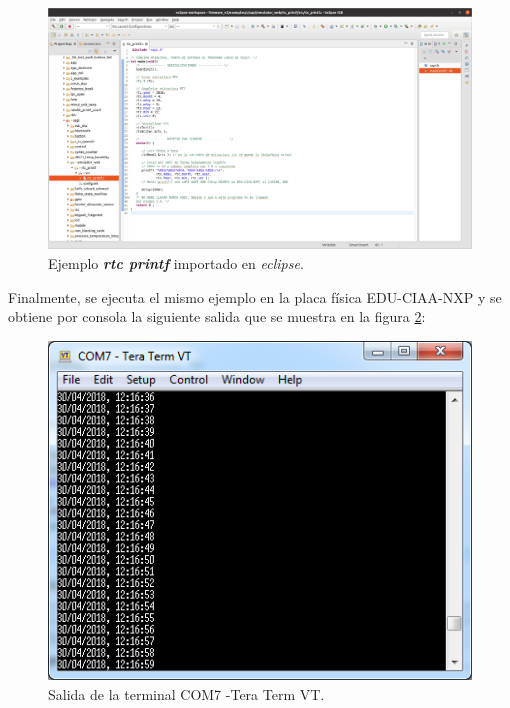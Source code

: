 \begin{figure}[ht]
	\centering
	\includegraphics[scale=.20]{./Figures/rtcprintfEclipse.png}
	\caption{Ejemplo \textit{\textbf{rtc printf}} importado en \textit{eclipse}.}
	\label{fig:rtcprintfEclipse}
\end{figure}

\hfill \break
\hfill \break
\hfill \break
\hfill \break
\hfill \break
\hfill \break
\hfill \break
\hfill \break


Finalmente, se ejecuta el mismo ejemplo en la placa física EDU-CIAA-NXP y se obtiene por consola la siguiente salida que se muestra en la figura \ref{fig:rtcprintfPlaca}:

\begin{figure}[ht]
	\centering
	\includegraphics[scale=.90]{./Figures/rtcprintfPlaca.png}
	\caption{Salida de la terminal COM7 -Tera Term VT.}
	\label{fig:rtcprintfPlaca}
\end{figure}




